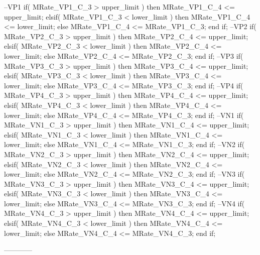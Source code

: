 \begin{mylisting}[language=VHDL,caption=ゲート信号出力モジュール,label=MMC_PWM_GEN_module_VHDL]
		--VP1
			if( MRate_VP1_C_3 > upper_limit ) then
				MRate_VP1_C_4 <= upper_limit;
			elsif( MRate_VP1_C_3	< lower_limit ) then
				MRate_VP1_C_4 <= lower_limit;
			else
				MRate_VP1_C_4 <= MRate_VP1_C_3;
			end if;
		--VP2
			if( MRate_VP2_C_3 > upper_limit ) then
				MRate_VP2_C_4 <= upper_limit;
			elsif( MRate_VP2_C_3	< lower_limit ) then
				MRate_VP2_C_4 <= lower_limit;
			else
				MRate_VP2_C_4 <= MRate_VP2_C_3;
			end if;
		--VP3
			if( MRate_VP3_C_3 > upper_limit ) then
				MRate_VP3_C_4 <= upper_limit;
			elsif( MRate_VP3_C_3	< lower_limit ) then
				MRate_VP3_C_4 <= lower_limit;
			else
				MRate_VP3_C_4 <= MRate_VP3_C_3;
			end if;
		--VP4
			if( MRate_VP4_C_3 > upper_limit ) then
				MRate_VP4_C_4 <= upper_limit;
			elsif( MRate_VP4_C_3	< lower_limit ) then
				MRate_VP4_C_4 <= lower_limit;
			else
				MRate_VP4_C_4 <= MRate_VP4_C_3;
			end if;
		--VN1
			if( MRate_VN1_C_3 > upper_limit ) then
				MRate_VN1_C_4 <= upper_limit;
			elsif( MRate_VN1_C_3	< lower_limit ) then
				MRate_VN1_C_4 <= lower_limit;
			else
				MRate_VN1_C_4 <= MRate_VN1_C_3;
			end if;
		--VN2
			if( MRate_VN2_C_3 > upper_limit ) then
				MRate_VN2_C_4 <= upper_limit;
			elsif( MRate_VN2_C_3	< lower_limit ) then
				MRate_VN2_C_4 <= lower_limit;
			else
				MRate_VN2_C_4 <= MRate_VN2_C_3;
			end if;
		--VN3
			if( MRate_VN3_C_3 > upper_limit ) then
				MRate_VN3_C_4 <= upper_limit;
			elsif( MRate_VN3_C_3	< lower_limit ) then
				MRate_VN3_C_4 <= lower_limit;
			else
				MRate_VN3_C_4 <= MRate_VN3_C_3;
			end if;
		--VN4
			if( MRate_VN4_C_3 > upper_limit ) then
				MRate_VN4_C_4 <= upper_limit;
			elsif( MRate_VN4_C_3	< lower_limit ) then
				MRate_VN4_C_4 <= lower_limit;
			else
				MRate_VN4_C_4 <= MRate_VN4_C_3;
			end if;

------------


\end{mylisting}
